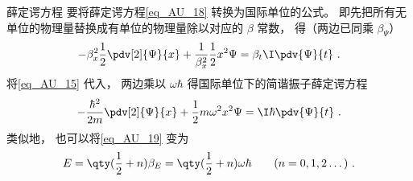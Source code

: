 \begin{example}{薛定谔方程}
要将薛定谔方程\autoref{eq_AU_18} 转换为国际单位的公式。 即先把所有无单位的物理量替换成有单位的物理量除以对应的 $\beta$ 常数， 得（两边已同乘 $\beta_\Psi$）
\begin{equation}
-\beta_x^2\frac12 \pdv[2]{\Psi}{x} + \frac{1}{\beta_x^2}\frac12 x^2 \Psi= \beta_t\I\pdv{\Psi}{t}~.
\end{equation}
将\autoref{eq_AU_15} 代入， 两边乘以 $\omega\hbar$ 得国际单位下的简谐振子薛定谔方程
\begin{equation}
-\frac{\hbar^2}{2m} \pdv[2]{\Psi}{x} + \frac12 m\omega^2 x^2 \Psi= \I\hbar\pdv{\Psi}{t}~.
\end{equation}
类似地， 也可以将\autoref{eq_AU_19} 变为
\begin{equation}
E =  \qty(\frac12 + n)\beta_E = \qty(\frac12 + n)\omega\hbar \qquad (n = 0, 1, 2\dots)~.
\end{equation}
\end{example}
